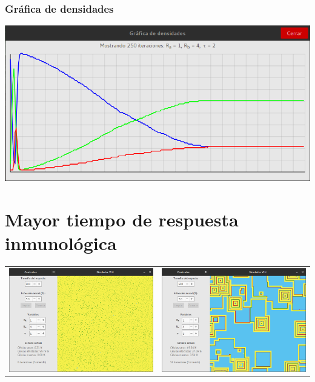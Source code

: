 \documentclass[12pt,letterpaper,oneside]{report}
\begin{document}
	\subsubsection{Gráfica de densidades}
	\begin{center}
		\includegraphics[width=14cm]{img/tiempo/prueba/baja/g.png}\\[3cm]
	\end{center}

	\section{Mayor tiempo de respuesta inmunológica} %
	\label{sec:mayor_tiempo_de_respuesta_inmunol_gica}
	\begin{center}
		\begin{tabular}{c c}
		\includegraphics[width=8cm]{img/tiempo/prueba/alta/1.png} & \includegraphics[width=8cm]{img/tiempo/prueba/alta/2.png} \\
		\end{tabular}
	\end{center}
\end{document}

